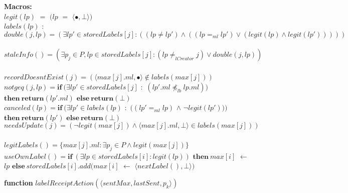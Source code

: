 \documentclass[11pt]{article}
\begin{document}
\begin{algorithm*}[t!]
\begin{small}
{\bf Macros:}\\
$legit(lp)$ $=$ $(lp$ $=$ $\langle \bullet, \bot \rangle)$~~~\\
$labels(lp)$ $:$ {}\\
$double(j, lp) = (\exists lp' \in storedLabels[j] : ((lp \neq lp') \land ((lp =_{ml} lp') \lor (legit(lp) \land legit(lp')))))$~~~\\ \label{ln:double}
$staleInfo() = (\exists p_j \in P, lp \in storedLabels[j] : (lp \neq_{lCreator} j)
\lor double(j, lp))$~~~\\ \label{ln:staleInfo}
$recordDoesntExist(j) = (\langle max[j].ml, \bullet \rangle \notin labels(max[j]))$~~~\\
$notgeq(j, lp) = \mathbf{if~}(\exists lp' \in storedLabels[j]$ $:$ $(lp'.ml \not \preceq_{lb} lp.ml))$ $\mathbf{then~return}(lp'.ml)$ $\mathbf{else~return}(\bot)$~~~\\
$canceled(lp) = \mathbf{if~}(\exists lp' \in labels(lp)$ $:$ $((lp' =_{ml} lp)$ $\land$ $\neg legit(lp')))$ $\mathbf{then~return}(lp')$ $\mathbf{else~return}(\bot)$~~~\\
$needsUpdate(j)=(\neg legit(max[j]) \land \langle max[j].ml, \bot \rangle \in labels(max[j]))$~~\\
$legitLabels() = \{ max[j].ml : \exists p_j \in P \land legit(max[j]) \}$~\label{ln:legitLabels}~\\
$useOwnLabel()=\mathbf{if~}(\exists lp \in storedLabels[i] : legit(lp))$ $\mathbf{then~}max[i]$ $\gets$ $lp$ $\mathbf{else~}storedLabels[i].add(max[i]$ $\gets$ $\langle nextLabel(), \bot \rangle)$~\label{ln:useOwnLabelDef}


{\bf function} $labelReceiptAction(\langle sentMax, lastSent, p_k \rangle)$
\end{small}
\end{algorithm*}
\end{document}
